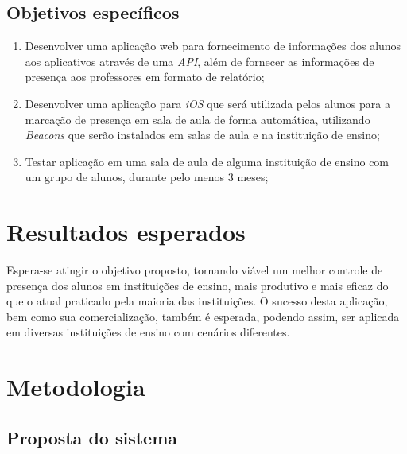\documentclass[
	12pt,
	oneside,
	a4paper,
	english,
	brazil,
]{abntex2}
\begin{document}
\section{Objetivos específicos}
\begin{enumerate}
  \item Desenvolver uma aplicação web para fornecimento de informações dos alunos aos aplicativos através de uma \emph{API}, além de fornecer as informações de presença aos professores em formato de relatório;
  \item Desenvolver uma aplicação para \emph{iOS} que será utilizada pelos alunos para a marcação de presença em sala de aula de forma automática, utilizando \emph{Beacons} que serão instalados em salas de aula e na instituição de ensino;
  \item Testar aplicação em uma sala de aula de alguma instituição de ensino com um grupo de alunos, durante pelo menos 3 meses;
\end{enumerate}


\chapter{Resultados esperados}

Espera-se atingir o objetivo proposto, tornando viável um melhor controle de presença dos alunos em instituições de ensino, mais produtivo e mais eficaz do que o atual praticado pela maioria das instituições.
O sucesso desta aplicação, bem como sua comercialização, também é esperada, podendo assim, ser aplicada em diversas instituições de ensino com cenários diferentes.



\chapter{Metodologia}
\section{Proposta do sistema}
\end{document}
